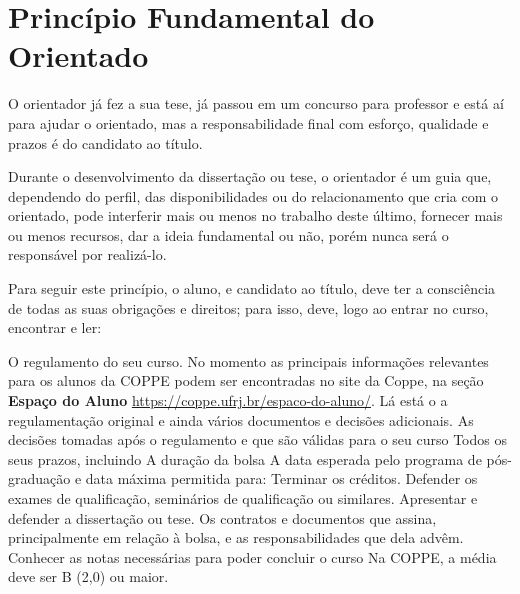 \chapter{Princípio Fundamental do Orientado}
\label{chap:pfo}



O orientador já fez a sua tese, já passou em um concurso para professor e está aí para ajudar o orientado, mas a responsabilidade final com esforço, qualidade e prazos é do candidato ao título.

Durante o desenvolvimento da dissertação ou tese, o orientador é um guia que, dependendo do perfil, das disponibilidades ou do relacionamento que cria com o orientado, pode interferir mais ou menos no trabalho deste último, fornecer mais ou menos recursos, dar a ideia fundamental ou não, porém nunca será o responsável por realizá-lo.

Para seguir este princípio, o aluno, e candidato ao título, deve ter a consciência de todas as suas obrigações e direitos; para isso, deve, logo ao entrar no curso, encontrar e ler:

\begin{outline}
\1	O regulamento do seu curso.
\2	No momento as principais informações relevantes para os alunos da COPPE podem ser encontradas no site da Coppe, na seção \textbf{Espaço do Aluno} \url{https://coppe.ufrj.br/espaco-do-aluno/}. Lá está o
a regulamentação original e ainda vários documentos e decisões adicionais.
\1	As decisões tomadas após o regulamento e que são válidas para o seu curso
\1	Todos os seus prazos, incluindo
\2	A duração da bolsa
\2	A data esperada pelo programa de pós-graduação e data máxima permitida para:
\3	Terminar os créditos.
\3	Defender os exames de qualificação, seminários de qualificação ou similares.
\3	Apresentar e defender a dissertação ou tese.
\1	Os contratos e documentos que assina, principalmente em relação à bolsa, e as responsabilidades que dela advêm.
\1	Conhecer as notas necessárias para poder concluir o curso
\2	Na COPPE, a média deve ser B (2,0) ou maior.
\end{outline}
